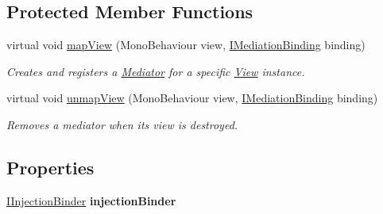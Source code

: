 \subsection*{Protected Member Functions}
\begin{DoxyCompactItemize}
\item 
virtual void \hyperlink{classstrange_1_1extensions_1_1mediation_1_1impl_1_1_mediation_binder_ae9f811869606deca9f750c039ab0d6a0}{map\-View} (Mono\-Behaviour view, \hyperlink{interfacestrange_1_1extensions_1_1mediation_1_1api_1_1_i_mediation_binding}{I\-Mediation\-Binding} binding)
\begin{DoxyCompactList}\small\item\em Creates and registers a \hyperlink{classstrange_1_1extensions_1_1mediation_1_1impl_1_1_mediator}{Mediator} for a specific \hyperlink{classstrange_1_1extensions_1_1mediation_1_1impl_1_1_view}{View} instance. \end{DoxyCompactList}\item 
\hypertarget{classstrange_1_1extensions_1_1mediation_1_1impl_1_1_mediation_binder_a29bfcbebcbfcb3d457e234fcf86984cc}{virtual void \hyperlink{classstrange_1_1extensions_1_1mediation_1_1impl_1_1_mediation_binder_a29bfcbebcbfcb3d457e234fcf86984cc}{unmap\-View} (Mono\-Behaviour view, \hyperlink{interfacestrange_1_1extensions_1_1mediation_1_1api_1_1_i_mediation_binding}{I\-Mediation\-Binding} binding)}\label{classstrange_1_1extensions_1_1mediation_1_1impl_1_1_mediation_binder_a29bfcbebcbfcb3d457e234fcf86984cc}

\begin{DoxyCompactList}\small\item\em Removes a mediator when its view is destroyed. \end{DoxyCompactList}\end{DoxyCompactItemize}
\subsection*{Properties}
\begin{DoxyCompactItemize}
\item 
\hypertarget{classstrange_1_1extensions_1_1mediation_1_1impl_1_1_mediation_binder_a7a568a85244a29ac0352ba7655cd9da9}{\hyperlink{interfacestrange_1_1extensions_1_1injector_1_1api_1_1_i_injection_binder}{I\-Injection\-Binder} {\bfseries injection\-Binder}}\label{classstrange_1_1extensions_1_1mediation_1_1impl_1_1_mediation_binder_a7a568a85244a29ac0352ba7655cd9da9}

\end{DoxyCompactItemize}
